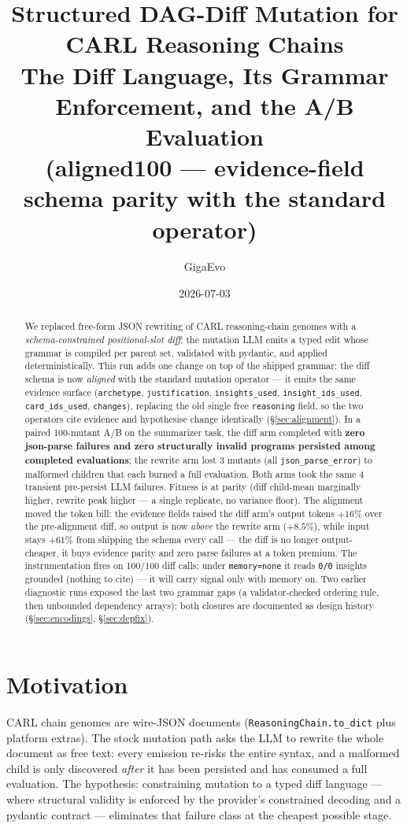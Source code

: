 \documentclass[11pt]{article}
\title{\color{accent}\bfseries Structured DAG-Diff Mutation for CARL Reasoning Chains\\
\large The Diff Language, Its Grammar Enforcement, and the A/B Evaluation\\
\large (aligned100 --- evidence-field schema parity with the standard operator)}
\author{GigaEvo}
\date{2026-07-03}
\begin{document}
\maketitle

\begin{abstract}
\noindent
We replaced free-form JSON rewriting of CARL reasoning-chain genomes with a
\emph{schema-constrained positional-slot diff}: the mutation LLM emits a typed edit whose
grammar is compiled per parent set, validated with pydantic, and applied deterministically.
This run adds one change on top of the shipped grammar: the diff schema is now
\emph{aligned} with the standard mutation operator --- it emits the same evidence surface
(\texttt{archetype}, \texttt{justification}, \texttt{insights\_used},
\texttt{insight\_ids\_used}, \texttt{card\_ids\_used}, \texttt{changes}), replacing the old
single free \texttt{reasoning} field, so the two operators cite evidence and hypothesise
change identically (\S\ref{sec:alignment}). In a paired 100-mutant A/B on the summarizer
task, the diff arm completed with \textbf{zero json-parse failures and zero structurally
invalid programs persisted among completed evaluations}; the rewrite arm lost 3 mutants
(all \texttt{json\_parse\_error}) to malformed children that each burned a full evaluation.
Both arms took the same 4 transient pre-persist LLM failures. Fitness is at parity (diff
child-mean marginally higher, rewrite peak higher --- a single replicate, no variance floor).
The alignment moved the token bill: the evidence fields raised the diff arm's output tokens
$+16\%$ over the pre-alignment diff, so output is now \emph{above} the rewrite arm
($+8.5\%$), while input stays $+61\%$ from shipping the schema every call --- the diff is no
longer output-cheaper, it buys evidence parity and zero parse failures at a token premium.
The instrumentation fires on 100/100 diff calls; under \texttt{memory=none} it reads
\texttt{0/0} insights grounded (nothing to cite) --- it will carry signal only with memory
on. Two earlier diagnostic runs exposed the last two grammar gaps (a validator-checked
ordering rule, then unbounded dependency arrays); both closures are documented as design
history (\S\ref{sec:encodings}, \S\ref{sec:depfix}).
\end{abstract}

\section{Motivation}
CARL chain genomes are wire-JSON documents (\texttt{ReasoningChain.to\_dict} plus platform
extras). The stock mutation path asks the LLM to rewrite the whole document as free text:
every emission re-risks the entire syntax, and a malformed child is only discovered
\emph{after} it has been persisted and has consumed a full evaluation. The hypothesis:
constraining mutation to a typed diff language --- where structural validity is enforced by
the provider's constrained decoding and a pydantic contract --- eliminates that failure class
at the cheapest possible stage.
\end{document}

